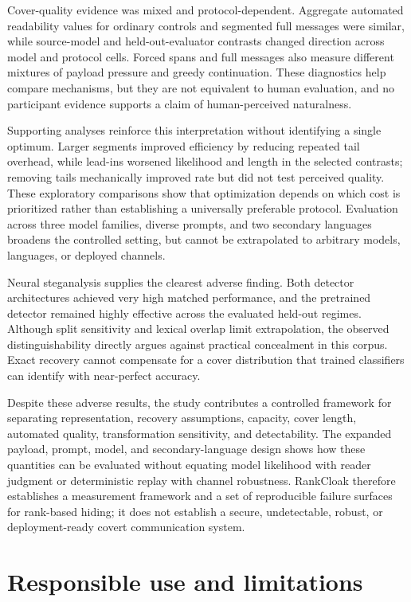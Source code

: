 \documentclass[fleqn,10pt]{wlscirep}
\begin{document}
Cover-quality evidence was mixed and protocol-dependent. Aggregate automated readability values for ordinary controls and segmented full messages were similar, while source-model and held-out-evaluator contrasts changed direction across model and protocol cells. Forced spans and full messages also measure different mixtures of payload pressure and greedy continuation. These diagnostics help compare mechanisms, but they are not equivalent to human evaluation, and no participant evidence supports a claim of human-perceived naturalness.

Supporting analyses reinforce this interpretation without identifying a single optimum. Larger segments improved efficiency by reducing repeated tail overhead, while lead-ins worsened likelihood and length in the selected contrasts; removing tails mechanically improved rate but did not test perceived quality. These exploratory comparisons show that optimization depends on which cost is prioritized rather than establishing a universally preferable protocol. Evaluation across three model families, diverse prompts, and two secondary languages broadens the controlled setting, but cannot be extrapolated to arbitrary models, languages, or deployed channels.

Neural steganalysis supplies the clearest adverse finding. Both detector architectures achieved very high matched performance, and the pretrained detector remained highly effective across the evaluated held-out regimes. Although split sensitivity and lexical overlap limit extrapolation, the observed distinguishability directly argues against practical concealment in this corpus. Exact recovery cannot compensate for a cover distribution that trained classifiers can identify with near-perfect accuracy.

Despite these adverse results, the study contributes a controlled framework for separating representation, recovery assumptions, capacity, cover length, automated quality, transformation sensitivity, and detectability. The expanded payload, prompt, model, and secondary-language design shows how these quantities can be evaluated without equating model likelihood with reader judgment or deterministic replay with channel robustness. RankCloak therefore establishes a measurement framework and a set of reproducible failure surfaces for rank-based hiding; it does not establish a secure, undetectable, robust, or deployment-ready covert communication system.

\section*{Responsible use and limitations}\label{sec:limitations}
\end{document}
